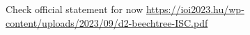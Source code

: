 Check official statement for now \url{https://ioi2023.hu/wp-content/uploads/2023/09/d2-beechtree-ISC.pdf}
